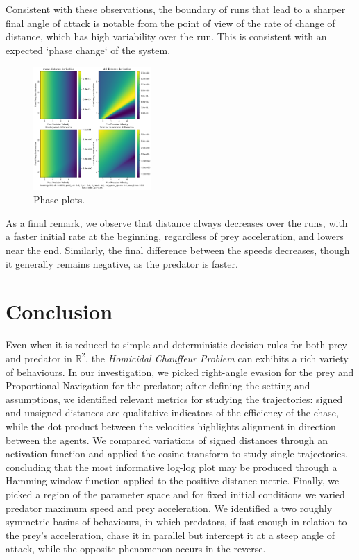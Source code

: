 \documentclass[11pt, twocolumn]{article}
\begin{document}
          Consistent with these observations, the boundary of runs that lead to a sharper final angle of attack is notable from the point of view of the rate of change of distance, which has high variability over the run. This is consistent with an expected `phase change` of the system.

          \begin{figure}[H]
            \centering
            \includegraphics[width=0.4\textwidth]{figures/phase_derivative_dist.png}
            \caption{Phase plots.}
            \label{fig:phaseplot3}
          \end{figure}

          As a final remark, we observe that distance always decreases over the runs, with a faster initial rate at the beginning, regardless of prey acceleration, and lowers near the end. Similarly, the final difference between the speeds decreases, though it generally remains negative, as the predator is faster.

          \hfil
          \section{Conclusion}
          Even when it is reduced to simple and deterministic decision rules for both prey and predator in $\mathbb{R}^2$, the \textit{Homicidal Chauffeur Problem} can exhibits a rich variety of behaviours. In our investigation, we picked right-angle evasion for the prey and Proportional Navigation for the predator; after defining the setting and assumptions, we identified relevant metrics for studying the trajectories: signed and unsigned distances are qualitative indicators of the efficiency of the chase, while the dot product between the velocities highlights alignment in direction between the agents. We compared variations of signed distances through an activation function and applied the cosine transform to study single trajectories, concluding that the most informative log-log plot may be produced through a Hamming window function applied to the positive distance metric. Finally, we picked a region of the parameter space and for fixed initial conditions we varied predator maximum speed and prey acceleration. We identified a two roughly symmetric basins of behaviours, in which predators, if fast enough in relation to the prey's acceleration, chase it in parallel but intercept it at a steep angle of attack, while the opposite phenomenon occurs in the reverse.
\end{document}
